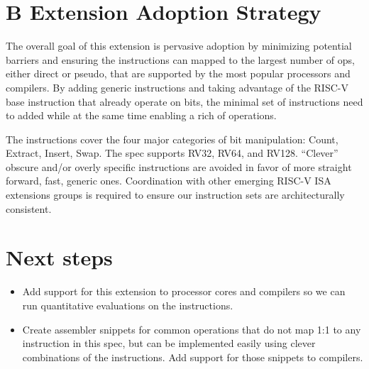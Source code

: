 \section{B Extension Adoption Strategy}

The overall goal of this extension is pervasive adoption by minimizing
potential barriers and ensuring the instructions can mapped to the
largest number of ops, either direct or pseudo, that are supported by
the most popular processors and compilers. By adding generic
instructions and taking advantage of the RISC-V base instruction that
already operate on bits, the minimal set of instructions need to added
while at the same time enabling a rich of operations.

The instructions cover the four major categories of bit manipulation: Count,
Extract, Insert, Swap. The spec supports RV32, RV64, and RV128. ``Clever''
obscure and/or overly specific instructions are avoided in favor of more
straight forward, fast, generic ones.  Coordination with other emerging RISC-V
ISA extensions groups is required to ensure our instruction sets are
architecturally consistent.

\section{Next steps}

\begin{itemize}
\item
  Add support for this extension to processor cores and compilers
  so we can run quantitative evaluations on the instructions.
\item
  Create assembler snippets for common operations that do not map 1:1
  to any instruction in this spec, but can be implemented easily using
  clever combinations of the instructions. Add support for those snippets
  to compilers.
\end{itemize}

